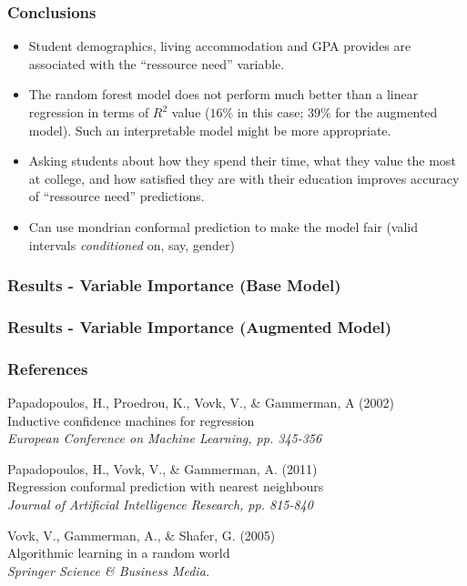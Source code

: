 \documentclass{beamer}
\begin{document}
\begin{frame} \frametitle{Conclusions}

\begin{itemize}
	\item Student demographics, living accommodation and GPA provides are associated with the ``ressource need'' variable.
	\item The random forest model does not perform much better than a linear regression in terms of $R^2$ value ($16\%$ in this case; $39\%$ for the augmented model). Such an interpretable model might be more appropriate.
	\item Asking students about how they spend their time, what they value the most at college, and how satisfied they are with their education improves accuracy of ``ressource need'' predictions.
	\item Can use mondrian conformal prediction to make the model fair (valid intervals \textit{conditioned} on, say, gender)
	
\end{itemize}


\end{frame}


\begin{frame} \frametitle{Results - Variable Importance (Base Model)}    

\end{frame}


\begin{frame} \frametitle{Results - Variable Importance (Augmented Model)}    

\end{frame}




\begin{frame}
\frametitle{References}
\footnotesize{
	\begin{thebibliography}{99} %
				
		 Papadopoulos, H., Proedrou, K., Vovk, V., \& Gammerman, A (2002)\\
		\newblock Inductive confidence machines for regression \\
		\newblock \emph{European Conference on Machine Learning, pp. 345-356}		
		
		 Papadopoulos, H., Vovk, V., \& Gammerman, A. (2011) \\
		\newblock Regression conformal prediction with nearest neighbours \\
		\newblock \emph{Journal of Artificial Intelligence Research, pp. 815-840}		
		
		 Vovk, V., Gammerman, A., \& Shafer, G. (2005) \\
		\newblock Algorithmic learning in a random world \\
		\newblock \emph{Springer Science \& Business Media.}
		
	\end{thebibliography}
}
\end{frame}
    
\end{document}
